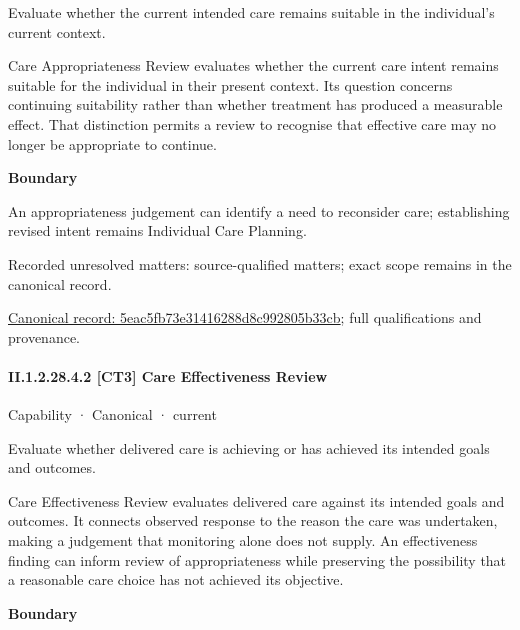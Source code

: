 Evaluate whether the current intended care remains suitable in the individual’s current context.



Care Appropriateness Review evaluates whether the current care intent remains suitable for the individual in their present context. Its question concerns continuing suitability rather than whether treatment has produced a measurable effect. That distinction permits a review to recognise that effective care may no longer be appropriate to continue.



\textbf{Boundary}



An appropriateness judgement can identify a need to reconsider care; establishing revised intent remains Individual Care Planning.


{\small Recorded unresolved matters: source-qualified matters; exact scope remains in the canonical record.}\par
{\footnotesize \href{../../../../continuum/strategy/capability/5eac5fb73e31416288d8c992805b33cb.md}{Canonical record: 5eac5fb73e31416288d8c992805b33cb}; full qualifications and provenance.}\par
\paragraph*{II.1.2.28.4.2 [CT3] Care Effectiveness Review}
\label{navigation:II.1.2.28.4.2}

\label{element:79cfeaefeb174a54ba43343d37f035c1}
{\small Capability · Canonical · current}\par

Evaluate whether delivered care is achieving or has achieved its intended goals and outcomes.



Care Effectiveness Review evaluates delivered care against its intended goals and outcomes. It connects observed response to the reason the care was undertaken, making a judgement that monitoring alone does not supply. An effectiveness finding can inform review of appropriateness while preserving the possibility that a reasonable care choice has not achieved its objective.



\textbf{Boundary}




